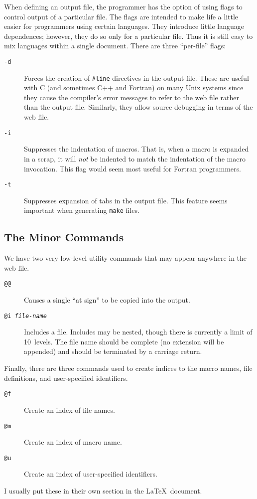 When defining an output file, the programmer has the option of using
flags to control output of a particular file. The flags are intended
to make life a little easier for programmers using certain languages.
They introduce little language dependences; however, they do so only
for a particular file. Thus it is still easy to mix languages within a
single document. There are three ``per-file'' flags:
\begin{description}
\item[\tt -d] Forces the creation of \verb|#line| directives in the
  output file. These are useful with C (and sometimes C++ and Fortran) on
  many Unix systems since they cause the compiler's error messages to
  refer to the web file rather than the output file. Similarly, they
  allow source debugging in terms of the web file.
\item[\tt -i] Suppresses the indentation of macros. That is, when a
  macro is expanded in a scrap, it will {\em not\/} be indented to
  match the indentation of the macro invocation. This flag would seem
  most useful for Fortran programmers.
\item[\tt -t] Suppresses expansion of tabs in the output file. This
  feature seems important when generating \verb|make| files.
\end{description}


\subsection{The Minor Commands}

We have two very low-level utility commands that may appear anywhere
in the web file.
\begin{description}
\item[\tt @@] Causes a single ``at sign'' to be copied into the output.
\item[\tt @i {\em file-name\/}] Includes a file. Includes may be
  nested, though there is currently a limit of 10~levels. The file name
  should be complete (no extension will be appended) and should be
  terminated by a carriage return.
\end{description}
Finally, there are three commands used to create indices to the macro
names, file definitions, and user-specified identifiers.
\begin{description}
\item[\tt @f] Create an index of file names.
\item[\tt @m] Create an index of macro name.
\item[\tt @u] Create an index of user-specified identifiers.
\end{description}
I usually put these in their own section
in the \LaTeX\ document.

